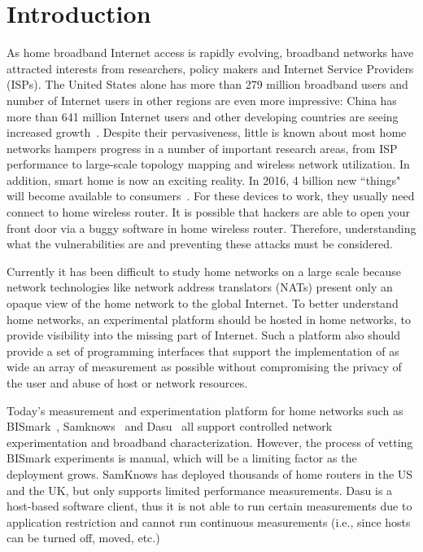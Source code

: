 \chapter{Introduction}
\label{sec.introduction}
As home broadband Internet access is rapidly evolving, broadband networks 
have attracted interests from researchers, policy makers and Internet 
Service Providers (ISPs). The United States alone has more than 279 million 
broadband users and number of Internet users in other regions are even more 
impressive: China has more than 641 million Internet users and other 
developing countries are seeing increased growth~\cite{asia}. Despite their 
pervasiveness, little is known about most home networks hampers progress in 
a number of important research areas, from ISP performance to large-scale 
topology mapping and wireless network utilization. In addition, smart home is now an exciting reality. In 2016, 4 billion new ``things" will become available to consumers~\cite{gartner}. For these devices to work, they usually need connect to home wireless router. It is possible that hackers are able to open your front door via a buggy software in home wireless router. Therefore, understanding what the vulnerabilities are and preventing these attacks must be considered.

Currently it has been difficult to study home networks on a large scale because network technologies like network address translators (NATs) present only an opaque view of the home network to the global Internet. To better understand home networks, an experimental platform should be hosted in home networks, to provide visibility into the missing part of Internet. Such a platform also should provide a set of programming interfaces that support the implementation of as wide an array of measurement as possible without compromising the privacy of the user and abuse of host or network resources. 

Today's measurement and experimentation platform for home networks such as 
BISmark~\cite{183951}, Samknows~\cite{samknows} and Dasu~\cite{
sanchez2014measurement} all support controlled network experimentation 
and broadband characterization. However, the process of vetting BISmark 
experiments is manual, which will be a limiting factor as the deployment 
grows. SamKnows has deployed thousands of home routers in the US and the UK, 
but only supports limited performance measurements. Dasu is a host-based 
software client, thus it is not able to run certain measurements due to 
application restriction and cannot run continuous measurements (i.e., since 
hosts can be turned off, moved, etc.)
 
